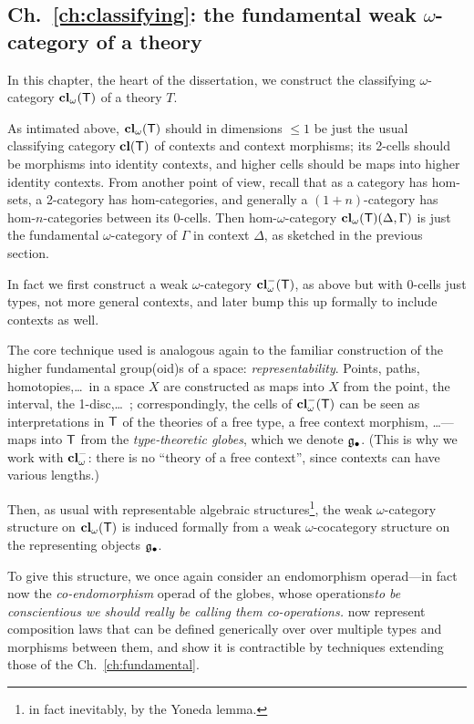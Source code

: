 \subsection*{Ch.~\ref{ch:classifying}: the fundamental weak $\omega$-category of a theory}

\begin{para}In this chapter, the heart of the dissertation, we construct the classifying $\omega$-category $\mathbf{cl}_\omega(\mathsf{T})$ of a theory $T$.

As intimated above, $\mathbf{cl}_\omega(\mathsf{T})$ should in dimensions $\leq 1$ be just the usual classifying category $\mathbf{cl}(\mathsf{T})$ of contexts and context morphisms; its 2-cells should be morphisms into identity contexts, and higher cells should be maps into higher identity contexts.  From another point of view, recall that as a category has hom-sets, a 2-category has hom-categories, and generally a $(1+n)$-category has hom-$n$-categories between its $0$-cells.  Then hom-$\omega$-category $\mathbf{cl}_\omega(\mathsf{T})(\Delta,\Gamma)$ is just the fundamental $\omega$-category of $\Gamma$ in context $\Delta$, as sketched in the previous section.

In fact we first construct a weak $\omega$-category $\mathbf{cl}_\omega^-(\mathsf{T})$, as above but with 0-cells just types, not more general contexts, and later bump this up formally to include contexts as well.

The core technique used is analogous again to the familiar construction of the higher fundamental group(oid)s of a space: \emph{representability}.  Points, paths, homotopies,\ldots\ in a space $X$ are constructed as maps into $X$ from the point, the interval, the 1-disc,\ldots\ ; correspondingly, the cells of $\mathbf{cl}_\omega^-(\mathsf{T})$ can be seen as interpretations in $\mathsf{T}$ of the theories of a free type, a free context morphism, \ldots ---maps into $\mathsf{T}$ from the \emph{type-theoretic globes}, which we denote $\mathfrak{g}_\bullet$.  (This is why we work with $\mathbf{cl}_\omega^-$: there is no ``theory of a free context'', since contexts can have various lengths.)

Then, as usual with representable algebraic structures\footnote{in fact inevitably, by the Yoneda lemma.}, the weak $\omega$-category structure on $\mathbf{cl}_\omega(\mathsf{T})$ is induced formally from a weak $\omega$-cocategory structure on the representing objects $\mathfrak{g}_\bullet$.

To give this structure, we once again consider an endomorphism operad---in fact now the \emph{co-endomorphism} operad of the globes, whose operations\emph{to be conscientious we should really be calling them co-operations.} now represent composition laws that can be defined generically over over multiple types and morphisms between them, and show it is contractible by techniques extending those of the Ch.~\ref{ch:fundamental}.
\end{para}

